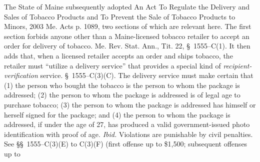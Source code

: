   The State of Maine subsequently adopted An Act To Regulate the
Delivery and Sales of Tobacco Products and To Prevent the Sale of
Tobacco Products to Minors, 2003 Me. Acts p. 1089, two sections of
which are relevant here. The first section forbids anyone other than
a Maine-licensed tobacco retailer to accept an order for delivery of
tobacco. Me. Rev. Stat. Ann., Tit. 22, \S~1555--C(1). It then adds
that, when a licensed retailer accepts an order and ships tobacco, the
retailer must ``utilize a delivery service'' that provides a special
kind of \emph{recipient-verification} service. \S~1555--C(3)(C).
The delivery service must make certain that (1) the person who bought
the tobacco is the person to whom the package is addressed; (2) the
person to whom the package is addressed is of legal age to purchase
tobacco; (3) the person to whom \newpage  the package is addressed has
himself or herself signed for the package; and (4) the person to whom
the package is addressed, if under the age of 27, has produced a valid
government-issued photo identification with proof of age. \emph{Ibid.}
Violations are punishable by civil penalties. See \S\S~1555--C(3)(E)
to C(3)(F) (first offense up to \$1,500; subsequent offenses up to

